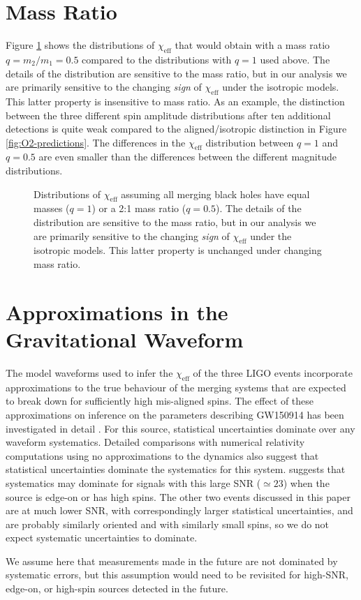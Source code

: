 \documentclass[modern,linenumbers]{aastex61}
\newcommand{\chieff}{\chi_\mathrm{eff}}
\begin{document}
\section{Mass Ratio}
\label{sec:mass-ratio}

Figure \ref{fig:mass-ratio-sensitivity} shows the distributions of
$\chieff$ that would obtain with a mass ratio $q = m_2/m_1 = 0.5$
compared to the distributions with $q = 1$ used above.  The details of
the distribution are sensitive to the mass ratio, but in our analysis
we are primarily sensitive to the changing \emph{sign} of $\chieff$
under the isotropic models.  This latter property is insensitive to
mass ratio.  As an example, the distinction between the three
different spin amplitude distributions after ten additional detections
is quite weak compared to the aligned/isotropic distinction in Figure
\ref{fig:O2-predictions}.  The differences in the $\chieff$
distribution between $q = 1$ and $q = 0.5$ are even smaller than the
differences between the different magnitude distributions.

\begin{figure}
  \caption{Distributions of $\chieff$ assuming all merging black holes
    have equal masses ($q=1$) or a 2:1 mass ratio ($q = 0.5$).  The
    details of the distribution are sensitive to the mass ratio, but
    in our analysis we are primarily sensitive to the changing
    \emph{sign} of $\chieff$ under the isotropic models.  This latter
    property is unchanged under changing mass ratio.}
  \label{fig:mass-ratio-sensitivity}
\end{figure}

\section{Approximations in the Gravitational Waveform}
The model waveforms used to infer the $\chieff$ of the three LIGO
events incorporate approximations to the true behaviour of the merging
systems that are expected to break down for sufficiently high
mis-aligned spins.  The effect of these approximations on inference on
the parameters describing GW150914 has been investigated in detail
\citep{2016arXiv161107531T}.  For this source, statistical uncertainties dominate
over any waveform systematics.  Detailed comparisons with numerical
relativity computations using no approximations to the dynamics
\citep{2016PhRvD..94f4035A} also suggest that statistical
uncertainties dominate the systematics for this system.
\citet{2016arXiv161107531T} suggests that systematics may dominate for
signals with this large SNR ($\simeq 23$) when the source is edge-on
or has high spins.  The other two events discussed in this paper are
at much lower SNR, with correspondingly larger statistical
uncertainties, and are probably similarly oriented and with similarly
small spins, so we do not expect systematic uncertainties to dominate.

We assume here that measurements made in the future are not dominated
by systematic errors, but this assumption would need to be revisited
for high-SNR, edge-on, or high-spin sources detected in the future.


\end{document}
